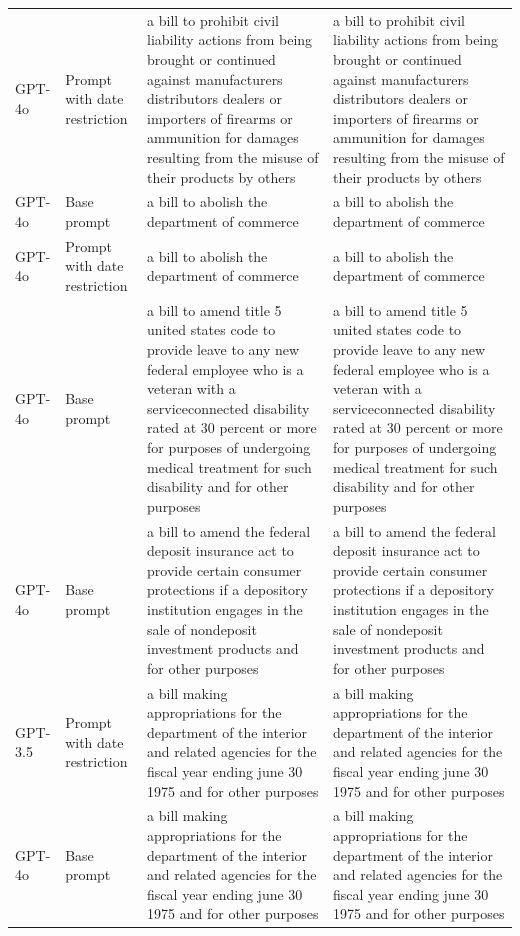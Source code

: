 \begin{longtable}{>{\raggedright\arraybackslash}p{1.4cm}>{\raggedright\arraybackslash}p{1.4cm}>{\raggedright\arraybackslash}p{5.5cm}>{\raggedright\arraybackslash}p{5.5cm}}
GPT-4o & Prompt with date restriction & a bill to prohibit civil liability actions from being brought or continued against manufacturers distributors dealers or importers of firearms or ammunition for damages resulting from the misuse of their products by others & a bill to prohibit civil liability actions from being brought or continued against manufacturers distributors dealers or importers of firearms or ammunition for damages resulting from the misuse of their products by others\\
GPT-4o & Base prompt & a bill to abolish the department of commerce & a bill to abolish the department of commerce\\
GPT-4o & Prompt with date restriction & a bill to abolish the department of commerce & a bill to abolish the department of commerce\\
GPT-4o & Base prompt & a bill to amend title 5 united states code to provide leave to any new federal employee who is a veteran with a serviceconnected disability rated at 30 percent or more for purposes of undergoing medical treatment for such disability and for other purposes & a bill to amend title 5 united states code to provide leave to any new federal employee who is a veteran with a serviceconnected disability rated at 30 percent or more for purposes of undergoing medical treatment for such disability and for other purposes\\
GPT-4o & Base prompt & a bill to amend the federal deposit insurance act to provide certain consumer protections if a depository institution engages in the sale of nondeposit investment products and for other purposes & a bill to amend the federal deposit insurance act to provide certain consumer protections if a depository institution engages in the sale of nondeposit investment products and for other purposes\\
GPT-3.5 & Prompt with date restriction & a bill making appropriations for the department of the interior and related agencies for the fiscal year ending june 30 1975 and for other purposes & a bill making appropriations for the department of the interior and related agencies for the fiscal year ending june 30 1975 and for other purposes\\
GPT-4o & Base prompt & a bill making appropriations for the department of the interior and related agencies for the fiscal year ending june 30 1975 and for other purposes & a bill making appropriations for the department of the interior and related agencies for the fiscal year ending june 30 1975 and for other purposes\\

\end{longtable}
